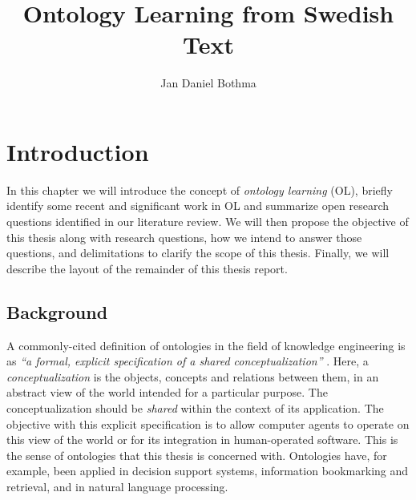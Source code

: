 \documentclass[a4paper]{report}
\title{Ontology Learning from Swedish Text}
\author{Jan Daniel Bothma}
\newcommand{\todo}[1]{\footnote{{\color{red} TODO: #1}}}
\begin{document}
\maketitle


\tableofcontents

\chapter{Introduction}

In this chapter we will introduce the concept of \emph{ontology learning} (OL), briefly identify some recent and significant work in OL and summarize open research questions identified in our literature review.
We will then propose the objective of this thesis along with research questions, how we intend to answer those questions, and delimitations to clarify the scope of this thesis. Finally, we will describe the layout of the remainder of this thesis report.

\section{Background}

A commonly-cited definition of ontologies in the field of knowledge engineering is as \emph{``a formal, explicit specification of a shared conceptualization''} \cite{StuderEtAl1998KEPM}.
Here, a \emph{conceptualization} is the objects, concepts and relations between them, in an abstract view of the world intended for a particular purpose.
The conceptualization should be \emph{shared} within the context of its application.
The objective with this explicit specification is to allow computer agents to operate on this view of the world or for its integration in human-operated software.
This is the sense of ontologies that this thesis is concerned with.
Ontologies have, for example, been applied in decision support systems, information bookmarking and retrieval, and in natural language processing.
\end{document}
